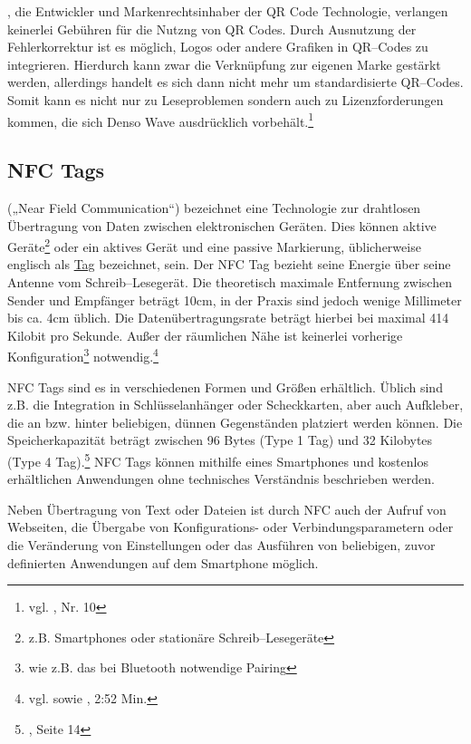 , die Entwickler und Markenrechtsinhaber der QR Code Technologie,  verlangen keinerlei Gebühren für die Nutzng von QR Codes. Durch Ausnutzung der Fehlerkorrektur ist es möglich, Logos oder andere Grafiken in QR–Codes zu integrieren. Hierdurch kann zwar die Verknüpfung zur eigenen Marke gestärkt werden, allerdings handelt es sich dann nicht mehr um standardisierte QR–Codes. Somit kann es nicht nur zu Leseproblemen sondern auch zu Lizenzforderungen kommen, die sich Denso Wave ausdrücklich vorbehält.\footnote{vgl. \cite{denso-faq}, Nr. 10}

\subsection{NFC Tags} %
\label{sub:nfc_tags}
 („Near Field Communication“) bezeichnet eine Technologie zur drahtlosen Übertragung von Daten zwischen elektronischen Geräten. Dies können aktive Geräte\footnote{z.B. Smartphones oder stationäre Schreib–Lesegeräte} oder ein aktives Gerät und eine passive Markierung, üblicherweise englisch als \url{Tag} bezeichnet, sein. Der NFC Tag bezieht seine Energie über seine Antenne vom Schreib–Lesegerät. Die theoretisch maximale Entfernung zwischen Sender und Empfänger beträgt 10cm, in der Praxis sind jedoch wenige Millimeter bis ca. 4cm üblich. Die Datenübertragungsrate beträgt hierbei bei maximal 414 Kilobit pro Sekunde. Außer der räumlichen Nähe ist keinerlei vorherige Konfiguration\footnote{wie z.B. das bei Bluetooth notwendige Pairing} notwendig.\footnote{vgl. \cite{nfcforum:about} sowie \cite{google:nfc}, 2:52 Min.}

NFC Tags sind es in verschiedenen Formen und Größen erhältlich. Üblich sind z.B. die Integration in Schlüsselanhänger oder Scheckkarten, aber auch Aufkleber, die an bzw. hinter beliebigen, dünnen Gegenständen platziert werden können. Die Speicherkapazität beträgt zwischen 96 Bytes (Type 1 Tag) und 32 Kilobytes (Type 4 Tag).\footnote{\cite{nfcforum:spec}, Seite 14} NFC Tags können mithilfe eines Smartphones und kostenlos erhältlichen Anwendungen ohne technisches Verständnis beschrieben werden.

Neben Übertragung von Text oder Dateien ist durch NFC auch der Aufruf von Webseiten, die Übergabe von Konfigurations- oder Verbindungsparametern oder die Veränderung von Einstellungen oder das Ausführen von beliebigen, zuvor definierten Anwendungen auf dem Smartphone möglich.



